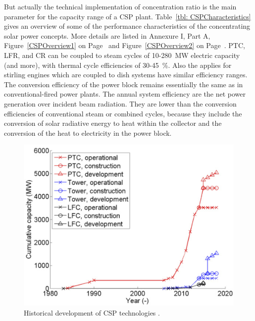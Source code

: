 But actually the technical implementation of concentration ratio is the main parameter for the capacity range of a CSP plant. Table~\ref{tbl: CSPCharacteristics} gives an overview of some of the performance characteristics of the concentrating solar power concepts. More details are listed in Annexure I, Part A, Figure~\ref{CSPOverview1} on Page~\pageref{CSPOverview1} and Figure~\ref{CSPOverview2} on Page~\pageref{CSPOverview2}. PTC, LFR, and CR can be coupled to steam cycles of 10-280~MW electric capacity (and more), with thermal cycle efficiencies of 30-45~\%. Also the applies for stirling engines which are coupled to dish systems have similar efficiency ranges. The conversion efficiency of the power block remains essentially the same as in conventional-fired power plants. The annual system efficiency are the net power generation over incident beam radiation. They are lower than the conversion efficiencies of conventional steam or combined cycles, because they include the conversion of solar radiative energy to heat within the collector and the conversion of the heat to electricity in the power block. \cite{Pitz-Paal.2013}

\begin{figure}[!h] 
\centering
\includegraphics[width=0.65\linewidth]{FIG/CSP_technology_development}
\caption[Historical development of CSP technologies.]{Historical development of CSP technologies \cite{Abbas2015}.}\label{CSP_technology_development}
\end{figure}


